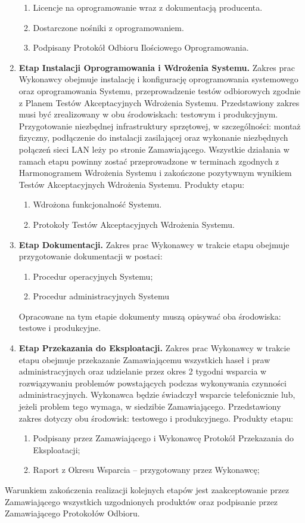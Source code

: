 \documentclass{article}
\begin{document}
\begin{enumerate}
\begin{enumerate}
\item Licencje na oprogramowanie wraz z dokumentacją producenta.
\item Dostarczone nośniki z oprogramowaniem.
\item Podpisany Protokół Odbioru Ilościowego Oprogramowania.
\end{enumerate}
\item \textbf{Etap Instalacji Oprogramowania i Wdrożenia Systemu.}
Zakres prac Wykonawcy obejmuje instalację i konfigurację oprogramowania systemowego oraz oprogramowania Systemu, przeprowadzenie testów odbiorowych zgodnie z Planem Testów Akceptacyjnych Wdrożenia Systemu. Przedstawiony zakres musi być zrealizowany w obu środowiskach: testowym i produkcyjnym. Przygotowanie niezbędnej infrastruktury sprzętowej, w szczególności: montaż fizyczny, podłączenie do instalacji zasilającej oraz wykonanie niezbędnych połączeń sieci LAN leży po stronie Zamawiającego. Wszystkie działania w ramach etapu powinny zostać przeprowadzone w terminach zgodnych z Harmonogramem Wdrożenia Systemu i zakończone pozytywnym wynikiem Testów Akceptacyjnych Wdrożenia Systemu. Produkty etapu:
\begin{enumerate}
\item Wdrożona funkcjonalność Systemu.
\item Protokoły Testów Akceptacyjnych Wdrożenia Systemu.
\end{enumerate}
\item \textbf{Etap Dokumentacji.} Zakres prac Wykonawcy w trakcie etapu obejmuje przygotowanie dokumentacji w postaci:
\begin{enumerate}
\item Procedur operacyjnych Systemu;
\item Procedur administracyjnych Systemu
\end{enumerate}
Opracowane na tym etapie dokumenty muszą opisywać oba środowiska: testowe i produkcyjne.
\item \textbf{Etap Przekazania do Eksploatacji.} Zakres prac Wykonawcy w trakcie etapu obejmuje przekazanie Zamawiającemu wszystkich haseł i praw administracyjnych oraz udzielanie przez okres 2 tygodni wsparcia w rozwiązywaniu problemów powstających podczas wykonywania czynności administracyjnych. Wykonawca będzie świadczył wsparcie telefonicznie lub, jeżeli problem tego wymaga, w siedzibie Zamawiającego. Przedstawiony zakres dotyczy obu środowisk: testowego i produkcyjnego. Produkty etapu:
\begin{enumerate}
\item Podpisany przez Zamawiającego i Wykonawcę Protokół Przekazania do Eksploatacji;
\item Raport z Okresu Wsparcia  – przygotowany przez Wykonawcę;
\end{enumerate}
\end{enumerate}
Warunkiem zakończenia realizacji kolejnych etapów jest zaakceptowanie przez Zamawiającego wszystkich uzgodnionych produktów oraz podpisanie przez Zamawiającego Protokołów Odbioru.
\end{document}
